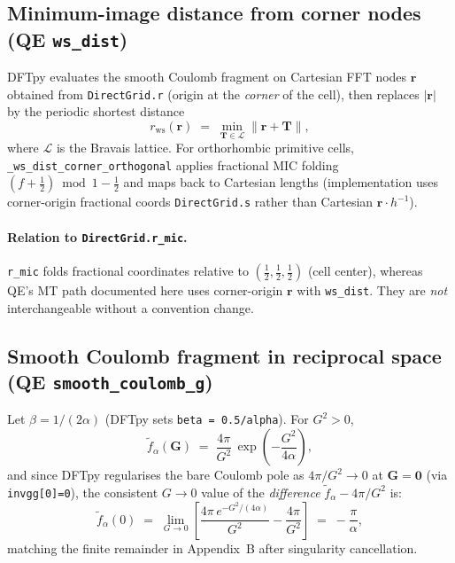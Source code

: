 \documentclass[11pt,a4paper]{article}
\begin{document}
\subsection{Minimum-image distance from corner nodes (QE \texttt{ws\_dist})}

DFTpy evaluates the smooth Coulomb fragment on Cartesian FFT nodes $\mathbf r$
obtained from \texttt{DirectGrid.r} (origin at the \emph{corner} of the cell),
then replaces $|\mathbf r|$ by the periodic shortest distance
\begin{equation}
  r_{\mathrm{ws}}(\mathbf r)
  \;=\;
  \min_{\mathbf T\in\mathcal{L}} \|\mathbf r + \mathbf T\|,
\end{equation}
where $\mathcal{L}$ is the Bravais lattice. For orthorhombic primitive cells,
\texttt{\_ws\_dist\_corner\_orthogonal} applies fractional MIC folding
$(f+\tfrac12)\bmod 1 - \tfrac12$ and maps back to Cartesian lengths (implementation uses
corner-origin fractional coords \texttt{DirectGrid.s} rather than Cartesian $\mathbf r\cdot h^{-1}$).

\paragraph{Relation to \texttt{DirectGrid.r\_mic}.}
\texttt{r\_mic} folds fractional coordinates relative to $(\tfrac12,\tfrac12,\tfrac12)$
(cell center), whereas QE's MT path documented here uses corner-origin $\mathbf r$
with \texttt{ws\_dist}. They are \emph{not} interchangeable without a convention change.

\subsection{Smooth Coulomb fragment in reciprocal space (QE \texttt{smooth\_coulomb\_g})}

Let $\beta = 1/(2\alpha)$ (DFTpy sets \texttt{beta = 0.5/alpha}). For $G^2>0$,
\begin{equation}
  \tilde f_\alpha(\mathbf G)
  \;=\;
  \frac{4\pi}{G^2}\,
  \exp\!\left(-\frac{G^2}{4\alpha}\right),
\end{equation}
and since DFTpy regularises the bare Coulomb pole as $4\pi/G^2\to 0$ at
$\mathbf G=\mathbf 0$ (via \texttt{invgg[0]=0}), the consistent $G\to 0$ value of
the \emph{difference} $\tilde f_\alpha - 4\pi/G^2$ is:
\begin{equation}
  \tilde f_\alpha(0)
  \;=\;
  \lim_{G\to 0}\left[\frac{4\pi\,e^{-G^2/(4\alpha)}}{G^2} - \frac{4\pi}{G^2}\right]
  \;=\;
  -\frac{\pi}{\alpha},
\end{equation}
matching the finite remainder in Appendix~B after singularity cancellation.
\end{document}
